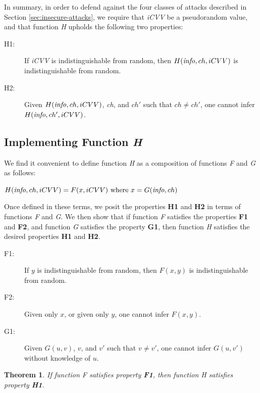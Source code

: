 In summary, in order to defend against the four classes of attacks described in Section \ref{sec:insecure-attacks},
	we require that \emph{iCVV} be a pseudorandom value, and that function \emph{H} upholds the following two properties:

\begin{description}
\item[H1:] If \emph{iCVV} is indistinguishable from random, then $H(\textrm{\emph{info}}, ch, iCVV)$ is indistinguishable from random.
\item[H2:] Given $H(\textrm{\emph{info}}, ch, iCVV)$, \emph{ch}, and $ch'$ such that $ch \neq ch'$, one cannot infer $H(\textrm{\emph{info}}, ch', iCVV)$.
\end{description}









\subsection{Implementing Function \emph{H}}

We find it convenient to define function \emph{H} as a composition of functions \emph{F} and \emph{G} as follows:

$H(\textrm{\emph{info}}, ch, iCVV) = F(x, iCVV) \textrm{ where } x = G(\textrm{\emph{info}}, ch)$

Once defined in these terms, we posit the properties \textbf{H1} and \textbf{H2} in terms of functions \emph{F} and \emph{G}.
We then show that if function \emph{F} satisfies the properties \textbf{F1} and \textbf{F2}, and function \emph{G} satisfies the property \textbf{G1},
then function \emph{H} satisfies the desired properties \textbf{H1} and \textbf{H2}.

\begin{description}
\item[F1:] If $y$ is indistinguishable from random, then $F(x, y)$ is indistinguishable from random.
\item[F2:] Given only $x$, or given only $y$, one cannot infer $F(x, y)$.
\item[G1:] Given $G(u, v)$, $v$, and $v'$ such that $v \neq v'$, one cannot infer $G(u, v')$ without knowledge of $u$.
\end{description}

\newtheorem{theorem}{Theorem}

\begin{theorem}
If function \emph{F} satisfies property \textbf{F1}, then function \emph{H} satisfies property \textbf{H1}.
\end{theorem}

